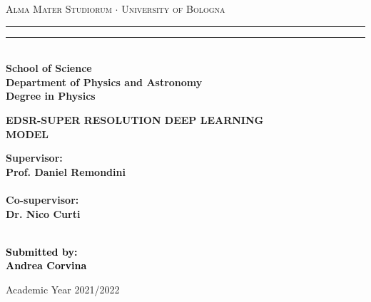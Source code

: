 \documentclass[a4paper, 10pt]{book}
\begin{document}
\begin{titlepage}
%
%
%
%
\begin{center}
{{\Large{\textsc{Alma Mater Studiorum $\cdot$ University of  Bologna}}}} 
\rule[0.1cm]{15.8cm}{0.1mm}
\rule[0.5cm]{15.8cm}{0.6mm}
\\\vspace{3mm}
{\small{\bf School of Science \\
Department of Physics and Astronomy\\
 Degree in Physics}}
\end{center}

\vspace{17mm}

\begin{center}
%
%
{\LARGE{\bf EDSR-SUPER RESOLUTION DEEP LEARNING \\ \vspace{3mm}MODEL
\\
}}
\end{center}

\vspace{30mm} \par \noindent

\begin{minipage}[t]{0.47\textwidth}

{\large{\bf Supervisor: \vspace{2mm}\\
Prof. Daniel Remondini\\\\

\bf Co-supervisor:
\vspace{2mm}
\\
Dr. Nico Curti\\\\}}
\end{minipage}
%
\hfill
%
\begin{minipage}[t]{0.47\textwidth}\raggedleft \textcolor{black}{
{\large{\bf Submitted by:
\vspace{2mm}\\
Andrea Corvina}}}
\end{minipage}

\vspace{40mm}

\begin{center}

Academic Year 2021/2022
\end{center}

\end{titlepage}
\end{document}
